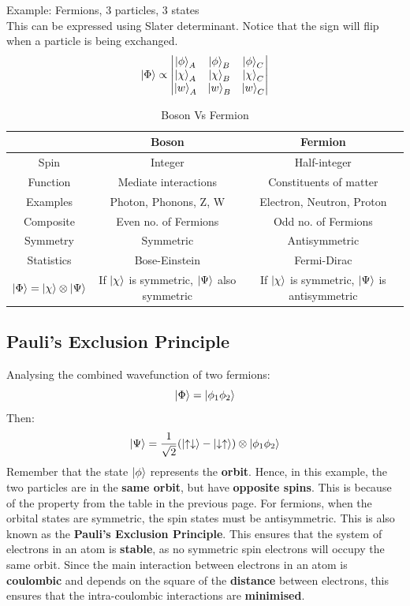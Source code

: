 \documentclass{article}
\begin{document}
\begin{flushleft}
Example: Fermions, 3 particles, 3 states\\
This can be expressed using Slater determinant. Notice that the sign will flip when a particle is being exchanged.
$$\ket{\Phi}\propto 
\begin{vmatrix}
     \ket{\phi}_{A} & \ket{\phi}_{B} & \ket{\phi}_{C}\\ 
     \ket{\chi}_{A} & \ket{\chi}_{B} & \ket{\chi}_{C}\\
     \ket{w}_{A} & \ket{w}_{B} & \ket{w}_{C} 
\end{vmatrix}$$

\begin{table}[h]
    \centering
    \begin{tabular}{|c|c|c|}
    \hline
       &\textbf{ Boson}    & \textbf{Fermion}\\
         \hline
     Spin  & Integer  & Half-integer \\
         \hline
      Function & Mediate interactions & Constituents of matter\\
      \hline
    Examples &Photon, Phonons, Z, W  & Electron, Neutron, Proton\\
    \hline
      Composite & Even no. of Fermions & Odd no. of Fermions \\
         \hline
        Symmetry & Symmetric & Antisymmetric\\
         \hline
         Statistics & Bose-Einstein & Fermi-Dirac\\
         \hline
        $\ket{\Phi}=\ket{\chi}\otimes\ket{\Psi}$ &If $\ket{\chi}$ is symmetric, $\ket{\Psi}$ also symmetric  & If $\ket{\chi}$ is symmetric, $\ket{\Psi}$ is antisymmetric\\
        \hline
    
    \end{tabular}
    \caption{Boson Vs Fermion}
   \end{table}

\pagebreak

\subsection{Pauli's Exclusion Principle}
Analysing the combined wavefunction of two fermions:
$$\ket{\Phi}=\ket{\phi_1\phi_2}$$
Then:
$$\ket{\Psi}=\frac{1}{\sqrt{2}}(\ket{\uparrow\downarrow}-\ket{\downarrow\uparrow})\otimes\ket{\phi_1\phi_2}$$
Remember that the state $\ket{\phi}$ represents the \textbf{orbit}. Hence, in this example, the two particles are in the \textbf{same orbit}, but have \textbf{opposite spins}. This is because of the property from the table in the previous page. For fermions, when the orbital states are symmetric, the spin states must be antisymmetric. This is also known as the\textbf{ Pauli's Exclusion Principle}. This ensures that the system of electrons in an atom is \textbf{stable}, as no symmetric spin electrons will occupy the same orbit. Since the main interaction between electrons in an atom is \textbf{coulombic} and depends on the square of the \textbf{distance} between electrons, this ensures that the intra-coulombic interactions are \textbf{minimised}.


\end{flushleft}
\end{document}
